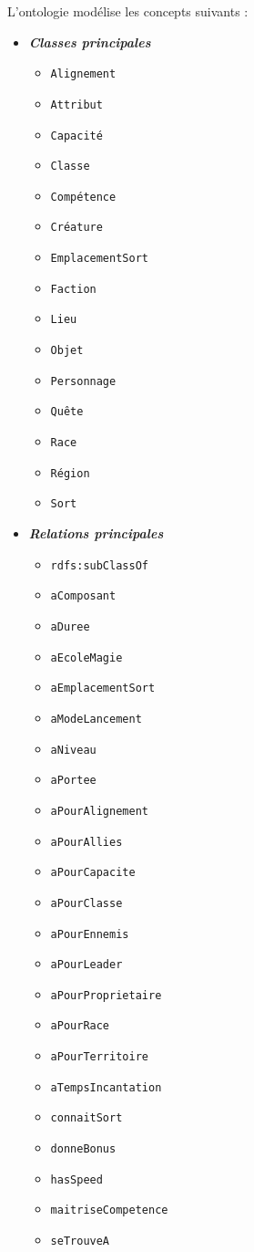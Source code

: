 \documentclass{article}
\newcommand{\cmd}[1]{\texttt{#1}}
\newcommand{\ib}[1]{\textit{\textbf{#1}}}
\begin{document}
L'ontologie modélise les concepts suivants :
\begin{itemize}
	\item \ib{Classes principales}
	\begin{itemize}
		\item \cmd{Alignement}
		\item \cmd{Attribut}
		\item \cmd{Capacité}
		\item \cmd{Classe}
		\item \cmd{Compétence}
		\item \cmd{Créature}
		\item \cmd{EmplacementSort}
		\item \cmd{Faction}
		\item \cmd{Lieu}
		\item \cmd{Objet}
		\item \cmd{Personnage}
		\item \cmd{Quête}
		\item \cmd{Race}
		\item \cmd{Région}
		\item \cmd{Sort}
	\end{itemize}
	\item \ib{Relations principales}
	\begin{itemize}
		\item \cmd{rdfs:subClassOf}
		\item \cmd{aComposant}
		\item \cmd{aDuree}
		\item \cmd{aEcoleMagie}
		\item \cmd{aEmplacementSort}
		\item \cmd{aModeLancement}
		\item \cmd{aNiveau}
		\item \cmd{aPortee}
		\item \cmd{aPourAlignement}
		\item \cmd{aPourAllies}
		\item \cmd{aPourCapacite}
		\item \cmd{aPourClasse}
		\item \cmd{aPourEnnemis}
		\item \cmd{aPourLeader}
		\item \cmd{aPourProprietaire}
		\item \cmd{aPourRace}
		\item \cmd{aPourTerritoire}
		\item \cmd{aTempsIncantation}
		\item \cmd{connaitSort}
		\item \cmd{donneBonus}
		\item \cmd{hasSpeed}
		\item \cmd{maitriseCompetence}
		\item \cmd{seTrouveA}
		
	\end{itemize}
\end{itemize}
\end{document}
